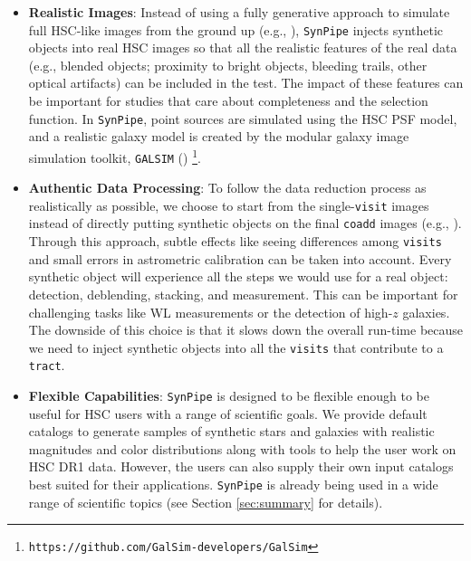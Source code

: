 \documentclass[useamsfonts]{pasj01}
\def\synpipe{\texttt{SynPipe}}
\def\coadd{\texttt{coadd}}
\def\tract{\texttt{tract}}
\def\visit{\texttt{visit}}
\def\visits{\texttt{visits}}
\def\galsim{\texttt{G}{\scriptsize \texttt{AL}}\texttt{S}{\scriptsize \texttt{IM}}}
\begin{document}
    \begin{itemize}

        \item \textbf{Realistic Images}:
            Instead of using a fully generative approach to simulate full HSC-like
            images from the ground up (e.g., \citealt{Chang2015}), \synpipe{} injects
            synthetic objects into real HSC images so that all the realistic
            features of the real data (e.g., blended objects; proximity to bright
            objects, bleeding trails, other optical artifacts) can be included in the
            test.
            The impact of these features can be important for studies that care about 
            completeness and the selection function.
            In \synpipe{}, point sources are simulated using the HSC PSF model,
            and a realistic galaxy model is created by the modular galaxy image
            simulation toolkit, \galsim{} (\citealt{Rowe2015})
            \footnote{\texttt{https://github.com/GalSim-developers/GalSim}}.

        \item \textbf{Authentic Data Processing}:
            To follow the data reduction process as realistically as possible, we 
            choose to start from the single-\visit{} images instead of directly putting 
            synthetic objects on the final \coadd{} images 
            (e.g., \citealt{Suchyta2016}).
            Through this approach, subtle effects like seeing differences among
            \visits{} and small errors in astrometric calibration can be taken
            into account.
            Every synthetic object will experience all the steps we would use for a 
            real object: detection, deblending, stacking, and measurement.
            This can be important for challenging tasks like WL measurements or the 
            detection of high-$z$ galaxies.
            The downside of this choice is that it slows down the overall run-time
            because we need to inject synthetic objects into all the \visits{} that 
            contribute to a \tract{}.
        
        \item \textbf{Flexible Capabilities}: 
            \synpipe{} is designed to be flexible enough to be useful for HSC users 
            with a range of scientific goals.
            We provide default catalogs to generate samples of synthetic stars
            and galaxies with realistic magnitudes and color distributions along with
            tools to help the user work on HSC DR1 data. 
            However, the users can also supply their own input catalogs best suited 
            for their applications.
            \synpipe{} is already being used in a wide range of
            scientific topics (see Section \ref{sec:summary} for details).

    \end{itemize}
\end{document}
